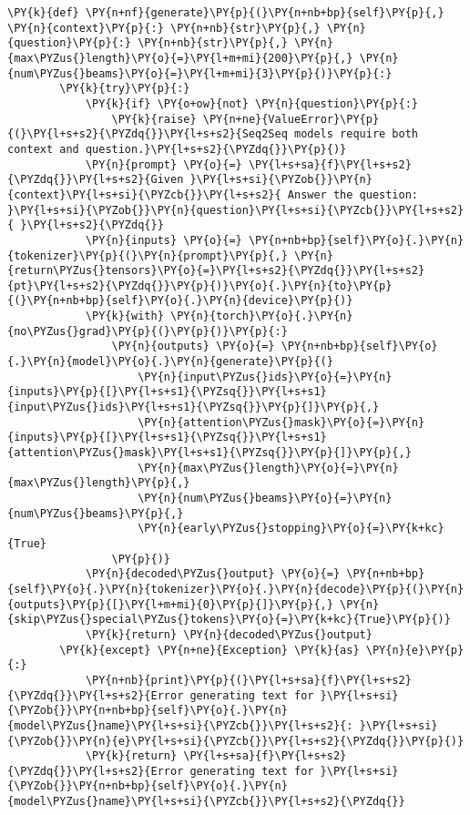 \documentclass[11pt]{wseas}
\begin{document}
\begin{tcolorbox}[breakable, size=fbox, boxrule=1pt, pad at break*=1mm,colback=cellbackground, colframe=cellborder]
\begin{Verbatim}[commandchars=\\\{\}]
    \PY{k}{def} \PY{n+nf}{generate}\PY{p}{(}\PY{n+nb+bp}{self}\PY{p}{,} \PY{n}{context}\PY{p}{:} \PY{n+nb}{str}\PY{p}{,} \PY{n}{question}\PY{p}{:} \PY{n+nb}{str}\PY{p}{,} \PY{n}{max\PYZus{}length}\PY{o}{=}\PY{l+m+mi}{200}\PY{p}{,} \PY{n}{num\PYZus{}beams}\PY{o}{=}\PY{l+m+mi}{3}\PY{p}{)}\PY{p}{:}
        \PY{k}{try}\PY{p}{:}
            \PY{k}{if} \PY{o+ow}{not} \PY{n}{question}\PY{p}{:}
                \PY{k}{raise} \PY{n+ne}{ValueError}\PY{p}{(}\PY{l+s+s2}{\PYZdq{}}\PY{l+s+s2}{Seq2Seq models require both context and question.}\PY{l+s+s2}{\PYZdq{}}\PY{p}{)}
            \PY{n}{prompt} \PY{o}{=} \PY{l+s+sa}{f}\PY{l+s+s2}{\PYZdq{}}\PY{l+s+s2}{Given }\PY{l+s+si}{\PYZob{}}\PY{n}{context}\PY{l+s+si}{\PYZcb{}}\PY{l+s+s2}{ Answer the question: }\PY{l+s+si}{\PYZob{}}\PY{n}{question}\PY{l+s+si}{\PYZcb{}}\PY{l+s+s2}{ }\PY{l+s+s2}{\PYZdq{}}
            \PY{n}{inputs} \PY{o}{=} \PY{n+nb+bp}{self}\PY{o}{.}\PY{n}{tokenizer}\PY{p}{(}\PY{n}{prompt}\PY{p}{,} \PY{n}{return\PYZus{}tensors}\PY{o}{=}\PY{l+s+s2}{\PYZdq{}}\PY{l+s+s2}{pt}\PY{l+s+s2}{\PYZdq{}}\PY{p}{)}\PY{o}{.}\PY{n}{to}\PY{p}{(}\PY{n+nb+bp}{self}\PY{o}{.}\PY{n}{device}\PY{p}{)}
            \PY{k}{with} \PY{n}{torch}\PY{o}{.}\PY{n}{no\PYZus{}grad}\PY{p}{(}\PY{p}{)}\PY{p}{:}
                \PY{n}{outputs} \PY{o}{=} \PY{n+nb+bp}{self}\PY{o}{.}\PY{n}{model}\PY{o}{.}\PY{n}{generate}\PY{p}{(}
                    \PY{n}{input\PYZus{}ids}\PY{o}{=}\PY{n}{inputs}\PY{p}{[}\PY{l+s+s1}{\PYZsq{}}\PY{l+s+s1}{input\PYZus{}ids}\PY{l+s+s1}{\PYZsq{}}\PY{p}{]}\PY{p}{,}
                    \PY{n}{attention\PYZus{}mask}\PY{o}{=}\PY{n}{inputs}\PY{p}{[}\PY{l+s+s1}{\PYZsq{}}\PY{l+s+s1}{attention\PYZus{}mask}\PY{l+s+s1}{\PYZsq{}}\PY{p}{]}\PY{p}{,}
                    \PY{n}{max\PYZus{}length}\PY{o}{=}\PY{n}{max\PYZus{}length}\PY{p}{,}
                    \PY{n}{num\PYZus{}beams}\PY{o}{=}\PY{n}{num\PYZus{}beams}\PY{p}{,}
                    \PY{n}{early\PYZus{}stopping}\PY{o}{=}\PY{k+kc}{True}
                \PY{p}{)}
            \PY{n}{decoded\PYZus{}output} \PY{o}{=} \PY{n+nb+bp}{self}\PY{o}{.}\PY{n}{tokenizer}\PY{o}{.}\PY{n}{decode}\PY{p}{(}\PY{n}{outputs}\PY{p}{[}\PY{l+m+mi}{0}\PY{p}{]}\PY{p}{,} \PY{n}{skip\PYZus{}special\PYZus{}tokens}\PY{o}{=}\PY{k+kc}{True}\PY{p}{)}
            \PY{k}{return} \PY{n}{decoded\PYZus{}output}
        \PY{k}{except} \PY{n+ne}{Exception} \PY{k}{as} \PY{n}{e}\PY{p}{:}
            \PY{n+nb}{print}\PY{p}{(}\PY{l+s+sa}{f}\PY{l+s+s2}{\PYZdq{}}\PY{l+s+s2}{Error generating text for }\PY{l+s+si}{\PYZob{}}\PY{n+nb+bp}{self}\PY{o}{.}\PY{n}{model\PYZus{}name}\PY{l+s+si}{\PYZcb{}}\PY{l+s+s2}{: }\PY{l+s+si}{\PYZob{}}\PY{n}{e}\PY{l+s+si}{\PYZcb{}}\PY{l+s+s2}{\PYZdq{}}\PY{p}{)}
            \PY{k}{return} \PY{l+s+sa}{f}\PY{l+s+s2}{\PYZdq{}}\PY{l+s+s2}{Error generating text for }\PY{l+s+si}{\PYZob{}}\PY{n+nb+bp}{self}\PY{o}{.}\PY{n}{model\PYZus{}name}\PY{l+s+si}{\PYZcb{}}\PY{l+s+s2}{\PYZdq{}}



\end{Verbatim}
\end{tcolorbox}
\end{document}
